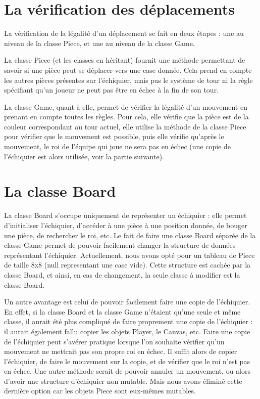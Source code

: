 \documentclass[11pt]{article}
\begin{document}
\section{La vérification des déplacements}

La vérification de la légalité d'un déplacement se fait en deux étapes : une au niveau de la classe Piece, et une au niveau de la classe Game.\newline

La classe Piece (et les classes en héritant) fournit une méthode permettant de savoir si une pièce peut se déplacer vers une case donnée. Cela prend en compte les autres pièces présentes sur l'échiquier, mais pas le système de tour ni la règle spécifiant qu'un joueur ne peut pas être en échec à la fin de son tour.\newline

La classe Game, quant à elle, permet de vérifier la légalité d'un mouvement en prenant en compte toutes les règles. Pour cela, elle vérifie que la pièce est de la couleur correspondant au tour actuel, elle utilise la méthode de la classe Piece pour vérifier que le mouvement est possible, puis elle vérifie qu'après le mouvement, le roi de l'équipe qui joue ne sera pas en échec (une copie de l'échiquier est alors utilisée, voir la partie suivante).

\section{La classe Board}

La classe Board s'occupe uniquement de représenter un échiquier : elle permet d'initialiser l'échiquier, d'accéder à une pièce à une position donnée, de bouger une pièce, de rechercher le roi, etc. Le fait de faire une classe Board séparée de la classe Game permet de pouvoir facilement changer la structure de données représentant l'échiquier. Actuellement, nous avons opté pour un tableau de Piece de taille 8x8 (null representant une case vide). Cette structure est cachée par la classe Board, et ainsi, en cas de changement, la seule classe à modifier est la classe Board.\newline

Un autre avantage est celui de pouvoir facilement faire une copie de l'échiquier. En effet, si la classe Board et la classe Game n'étaient qu'une seule et même classe, il aurait été plus compliqué de faire proprement une copie de l'échiquier : il aurait également fallu copier les objets Player, le Canvas, etc.
Faire une copie de l'échiquier peut s'avérer pratique lorsque l'on souhaite vérifier qu'un mouvement ne mettrait pas son propre roi en échec. Il suffit alors de copier l'échiquier, de faire le mouvement sur la copie, et de vérifier que le roi n'est pas en échec. Une autre méthode serait de pouvoir annuler un mouvement, ou alors d'avoir une structure d'échiquier non mutable. Mais nous avons éliminé cette dernière option car les objets Piece sont eux-mêmes mutables.
\end{document}
